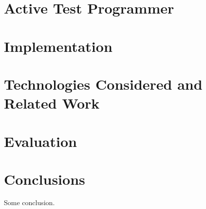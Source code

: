 \documentclass[twocolumn]{article}
\begin{document}
\section{Active Test Programmer}

\section{Implementation}

\section{Technologies Considered and Related Work}

\section{Evaluation}

\section{Conclusions}
Some conclusion.



\end{document}
